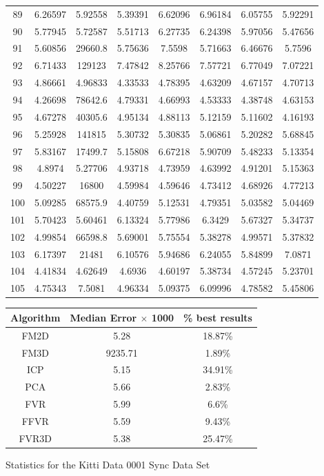 \begin{figure}
\begin{tabular}{cccccccc}
89 & 6.26597 & 5.92558 & 5.39391 & 6.62096 & 6.96184 & 6.05755 & 5.92291\\
90 & 5.77945 & 5.72587 & 5.51713 & 6.27735 & 6.24398 & 5.97056 & 5.47656\\
91 & 5.60856 & 29660.8 & 5.75636 & 7.5598 & 5.71663 & 6.46676 & 5.7596\\
92 & 6.71433 & 129123 & 7.47842 & 8.25766 & 7.57721 & 6.77049 & 7.07221\\
93 & 4.86661 & 4.96833 & 4.33533 & 4.78395 & 4.63209 & 4.67157 & 4.70713\\
94 & 4.26698 & 78642.6 & 4.79331 & 4.66993 & 4.53333 & 4.38748 & 4.63153\\
95 & 4.67278 & 40305.6 & 4.95134 & 4.88113 & 5.12159 & 5.11602 & 4.16193\\
96 & 5.25928 & 141815 & 5.30732 & 5.30835 & 5.06861 & 5.20282 & 5.68845\\
97 & 5.83167 & 17499.7 & 5.15808 & 6.67218 & 5.90709 & 5.48233 & 5.13354\\
98 & 4.8974 & 5.27706 & 4.93718 & 4.73959 & 4.63992 & 4.91201 & 5.15363\\
99 & 4.50227 & 16800 & 4.59984 & 4.59646 & 4.73412 & 4.68926 & 4.77213\\
100 & 5.09285 & 68575.9 & 4.40759 & 5.12531 & 4.79351 & 5.03582 & 5.04469\\
101 & 5.70423 & 5.60461 & 6.13324 & 5.77986 & 6.3429 & 5.67327 & 5.34737\\
102 & 4.99854 & 66598.8 & 5.69001 & 5.75554 & 5.38278 & 4.99571 & 5.37832\\
103 & 6.17397 & 21481 & 6.10576 & 5.94686 & 6.24055 & 5.84899 & 7.0871\\
104 & 4.41834 & 4.62649 & 4.6936 & 4.60197 & 5.38734 & 4.57245 & 5.23701\\
105 & 4.75343 & 7.5081 & 4.96334 & 5.09375 & 6.09996 & 4.78582 & 5.45806\\
\end{tabular}
\vspace{10mm}
\centering
\begin{tabular}{ccc}
\hline
\textbf{Algorithm} & \textbf{Median Error $\times$ 1000} & \textbf{\% best results}\\ \hline
FM2D	& 5.28 & 18.87\%\\
FM3D	& 9235.71 & 1.89\%\\
ICP	& 5.15 & 34.91\%\\
PCA	& 5.66 & 2.83\%\\
FVR	& 5.99 & 6.6\%\\
FFVR	& 5.59 & 9.43\%\\
FVR3D	& 5.38 & 25.47\%\\
\end{tabular}
\caption{Statistics for the Kitti Data 0001 Sync Data Set}
\label{tab:kittidata0001sync}
\end{figure} 



